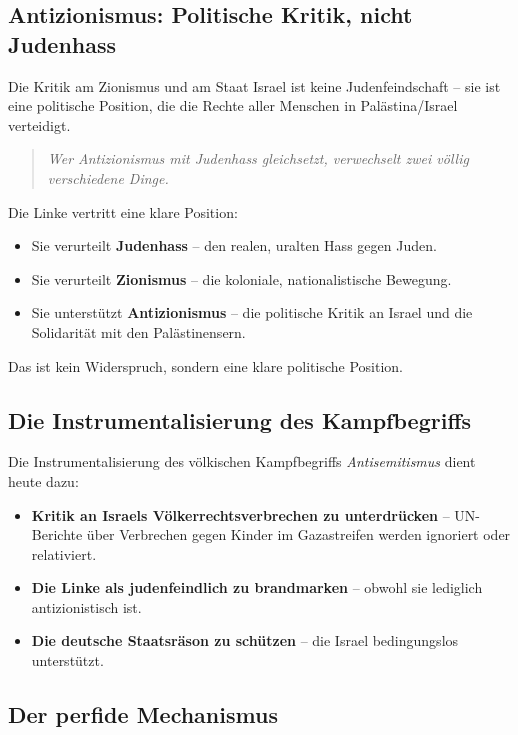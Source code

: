 \subsection{Antizionismus: Politische Kritik, nicht Judenhass}

Die Kritik am Zionismus und am Staat Israel ist keine Judenfeindschaft – sie ist eine politische Position, die die Rechte aller Menschen in Palästina/Israel verteidigt.

\begin{quote}
\emph{Wer Antizionismus mit Judenhass gleichsetzt, verwechselt zwei völlig verschiedene Dinge.}
\end{quote}

Die Linke vertritt eine klare Position:

\begin{itemize}
    \item Sie verurteilt \textbf{Judenhass} – den realen, uralten Hass gegen Juden.
    \item Sie verurteilt \textbf{Zionismus} – die koloniale, nationalistische Bewegung.
    \item Sie unterstützt \textbf{Antizionismus} – die politische Kritik an Israel und die Solidarität mit den Palästinensern.
\end{itemize}

Das ist kein Widerspruch, sondern eine klare politische Position.

\subsection{Die Instrumentalisierung des Kampfbegriffs}

Die Instrumentalisierung des völkischen Kampfbegriffs \emph{Antisemitismus} dient heute dazu:

\begin{itemize}
    \item \textbf{Kritik an Israels Völkerrechtsverbrechen zu unterdrücken} – UN-Berichte über Verbrechen gegen Kinder im Gazastreifen werden ignoriert oder relativiert.
    \item \textbf{Die Linke als judenfeindlich zu brandmarken} – obwohl sie lediglich antizionistisch ist.
    \item \textbf{Die deutsche Staatsräson zu schützen} – die Israel bedingungslos unterstützt.
\end{itemize}

\subsection{Der perfide Mechanismus}

